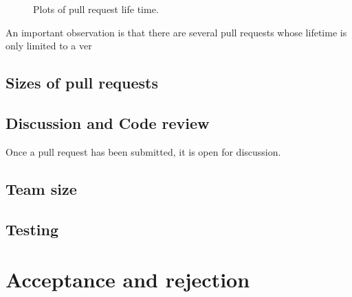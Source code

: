 \documentclass{sig-alternate}
\begin{document}
\begin{figure*}
\centering
{}
\caption{Plots of pull request life time.}
\end{figure*}


An important observation is that there are several pull requests whose
lifetime is only limited to a ver

\subsection{Sizes of pull requests}

\subsection{Discussion and Code review}

Once a pull request has been submitted, it is open for discussion.

\subsection{Team size}

\subsection{Testing}

\section{Acceptance and rejection}
\end{document}
